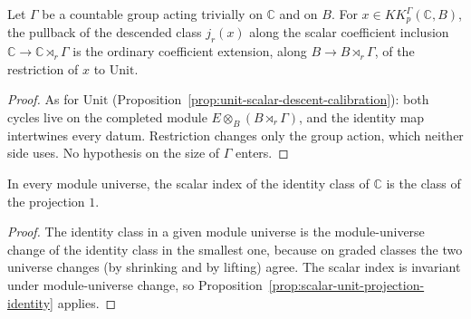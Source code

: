 \begin{proposition}\label{prop:subsingleton-scalar-descent-calibration}
\leanok
Let $\Gamma$ be a countable group acting trivially on $\mathbb C$ and on $B$.
For $x\in KK^{\Gamma}_p(\mathbb C,B)$, the pullback of the descended class
$j_r(x)$ along the scalar coefficient inclusion
$\mathbb C\to\mathbb C\rtimes_r\Gamma$ is the ordinary coefficient extension,
along $B\to B\rtimes_r\Gamma$, of the restriction of $x$ to $\mathrm{Unit}$.
\end{proposition}
\begin{proof}
\leanok
As for $\mathrm{Unit}$ (Proposition~\ref{prop:unit-scalar-descent-calibration}):
both cycles live on the completed module $E\otimes_B(B\rtimes_r\Gamma)$, and
the identity map intertwines every datum. Restriction changes only the group
action, which neither side uses. No hypothesis on the size of $\Gamma$ enters.
\end{proof}

\begin{proposition}\label{prop:scalar-unit-projection-identity-universe}
\leanok
In every module universe, the scalar index of the identity class of
$\mathbb C$ is the class of the projection $1$.
\end{proposition}
\begin{proof}
\leanok
The identity class in a given module universe is the module-universe change of
the identity class in the smallest one, because on graded classes the two
universe changes (by shrinking and by lifting) agree. The scalar index is
invariant under module-universe change, so
Proposition~\ref{prop:scalar-unit-projection-identity} applies.
\end{proof}


